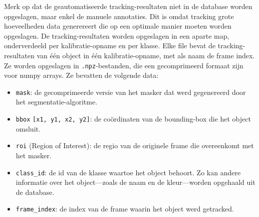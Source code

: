 Merk op dat de geautomatiseerde tracking-resultaten niet in de database worden opgeslagen, maar enkel de manuele annotaties.
Dit is omdat tracking grote hoeveelheden data generereert die op een optimale manier moeten worden opgeslagen.
De tracking-resultaten worden opgeslagen in een aparte map, onderverdeeld per kalibratie-opname en per klasse.
Elke file bevat de tracking-resultaten van één object in één kalibratie-opname, met als naam de frame index.
Ze worden opgeslagen in \texttt{.npz}-bestanden, die een gecomprimeerd formaat zijn voor numpy arrays.
Ze bevatten de volgende data:
\begin{itemize}
  \item \texttt{mask}: de gecomprimeerde versie van het masker dat werd gegenereerd door het segmentatie-algoritme.
  \item \texttt{bbox} \texttt{[x1, y1, x2, y2]}: de coördinaten van de bounding-box die het object omsluit.
  \item \texttt{roi} (Region of Interest): de regio van de originele frame die overeenkomt met het masker.
  \item \texttt{class\_id}: de id van de klasse waartoe het object behoort. 
  Zo kan andere informatie over het object---zoals de naam en de kleur---worden opgehaald uit de database.
  \item \texttt{frame\_index}: de index van de frame waarin het object werd getracked.
\end{itemize}

